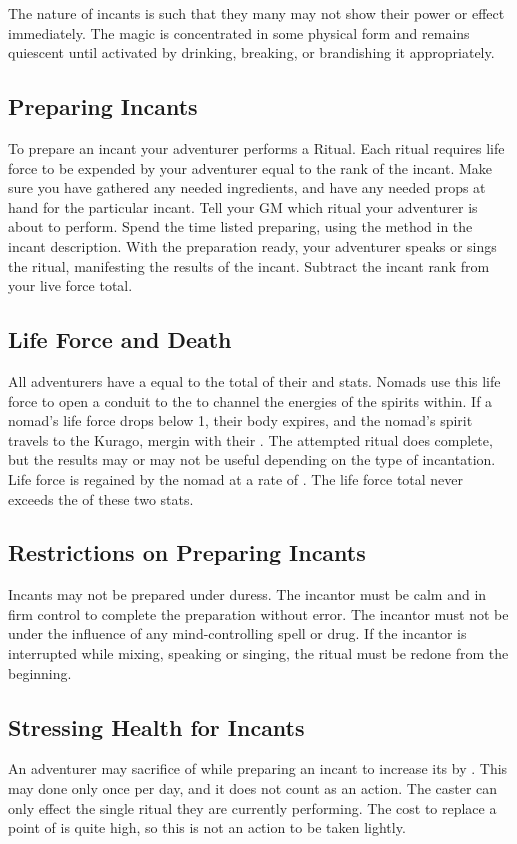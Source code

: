 \begin{multicols}{2}
The nature of incants is such that they many may not show their power or effect immediately. The magic is concentrated in some physical form and remains quiescent until activated by drinking, breaking, or brandishing it appropriately.
\subsection{Preparing Incants}
To prepare an incant your adventurer performs a Ritual. Each ritual requires life force to be expended by your adventurer equal to the rank of the incant. Make sure you have gathered any needed ingredients, and have any needed props at hand for the particular incant. Tell your GM which ritual your adventurer is about to perform. Spend the time listed preparing, using the method in the incant description. With the preparation ready, your adventurer speaks or sings the ritual, manifesting the results of the incant. Subtract the incant rank from your live force total.
\subsection{Life Force and Death}
All adventurers have a  equal to the total of their \HEA and \PER stats. Nomads use this life force to open a conduit to the  to channel the energies of the spirits within. If a nomad's life force drops below 1, their body expires, and the nomad's spirit travels to the Kurago, mergin with their . The attempted ritual does complete, but the results may or may not be useful depending on the type of incantation. Life force is regained by the nomad at a rate of . The life force total never exceeds the  of these two stats.
\subsection{Restrictions on Preparing Incants}
Incants may not be prepared under duress. The incantor must be calm and in firm control to complete the preparation without error. The incantor must not be under the influence of any mind-controlling spell or drug. If the incantor is interrupted while mixing, speaking or singing, the ritual must be redone from the beginning.
\subsection{Stressing Health for Incants}
An adventurer may sacrifice  of \HEA while preparing an incant to increase its  by . This may done only once per day, and it does not count as an action. The caster can only effect the single ritual they are currently performing. The cost to replace a point of \HEA is quite high, so this is not an action to be taken lightly.

\end{multicols}
